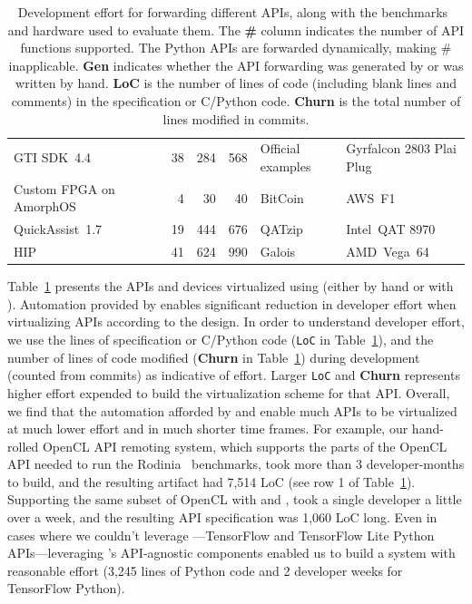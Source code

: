 \begin{table}
\begin{tabular}{lcrrrll}
	GTI SDK~4.4                 & \checkmark       & 38                   & 284                    & 568                     & Official examples    & Gyrfalcon 2803 Plai Plug                         \\
	Custom FPGA on AmorphOS~\cite{amorphos}     & \checkmark       & 4                    & 30                     & 40                      & BitCoin  & AWS~F1                                        \\
	QuickAssist~1.7             & \checkmark       & 19                   & 444                    & 676                     & QATzip                   & Intel~QAT 8970                      \\
	HIP                         & \checkmark       & 41                   & 624                    & 990                     & Galois~\cite{tao}        & AMD~Vega~64                                   \\
	\bottomrule
	\end{tabular}
	\caption{Development effort for forwarding different APIs, along with the benchmarks~\cite{inceptionv3,vggnet,rodinia} and hardware used to evaluate them. The \textbf{\#} column indicates the number of API functions supported. The Python APIs are forwarded dynamically, making \# inapplicable. \textbf{Gen} indicates whether the API forwarding was generated by \CAvA or was written by hand. \textbf{LoC} is the number of lines of code (including blank lines and comments) in the \CAvA specification or C/Python code. \textbf{Churn} is the total number of lines modified in commits.}
	\label{tab:apis-and-accs}
\end{table}

Table~\ref{tab:apis-and-accs} presents the \numframeworks APIs and
\numaccelerators devices virtualized using \hira (either by hand or with
\CAvA). Automation provided by \CAvA enables significant reduction in
developer effort when virtualizing APIs according to the \hira design. In
order to understand developer effort, we use the lines of \lapis specification
or C/Python code (\texttt{LoC} in Table~\ref{tab:apis-and-accs}), and the
number of lines of code modified (\textbf{Churn} in
Table~\ref{tab:apis-and-accs}) during development (counted from commits) as
indicative of effort. Larger \texttt{LoC} and \textbf{Churn} represents higher
effort expended to build the virtualization scheme for that API. Overall, we
find that the automation afforded by \lapis and \CAvA enable much APIs to be
virtualized at much lower effort and in much shorter time frames.
For example, our hand-rolled OpenCL API remoting system, which supports the
parts of the OpenCL API needed to run the Rodinia~\cite{rodinia} benchmarks,
took more than 3 developer-months to build, and the resulting artifact had
7,514 LoC (see row 1 of Table~\ref{tab:apis-and-accs}).
Supporting the same subset of OpenCL with \lapis and \CAvA, took a single
developer a little over a week, and the resulting API specification was 1,060
LoC long. Even in cases where we couldn't leverage \AvA---TensorFlow and
TensorFlow Lite Python APIs---leveraging \AvA's API-agnostic components
enabled us to build a \hira system with reasonable effort (3,245 lines of
Python code and 2 developer weeks for TensorFlow Python).

